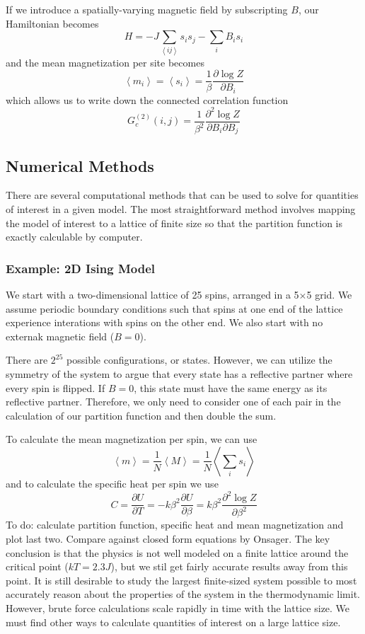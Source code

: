 \documentclass{article}
\begin{document}
If we introduce a spatially-varying magnetic field by subscripting $B$, our
Hamiltonian becomes
$$H = -J\sum_{\left \langle ij \right \rangle }s_{i}s_{j} - \sum_{i}B_{i}s_{i}$$
and the mean magnetization per site becomes
$$\left \langle m_{i} \right \rangle = \left \langle s_{i} \right \rangle = \frac{1}{\beta}\frac{\partial \log Z}{\partial B_{i}}$$
which allows us to write down the connected correlation function
$$G_{c}^{(2)}(i,j) = \frac{1}{\beta^{2}}\frac{\partial^{2} \log Z}{\partial B_{i}\partial B_{j}}$$

\subsection{Numerical Methods}
There are several computational methods that can be used to solve
for quantities of interest in a given model. The most straightforward method
involves mapping the model of interest to a lattice of finite size so that
the partition function is exactly calculable by computer.

\subsubsection{Example: 2D Ising Model}
We start with a two-dimensional lattice of 25 spins, arranged in a 5$\times$5 grid.
We assume periodic boundary conditions such that spins at one end of the lattice
experience interations with spins on the other end. We also start with no externak
magnetic field ($B = 0$).

There are $2^{25}$ possible configurations, or states. However, we can utilize
the symmetry of the system to argue that every state has a reflective partner
where every spin is flipped. If $B = 0$, this state must have the same energy
as its reflective partner. Therefore, we only need to consider one of each pair in
the calculation of our partition function and then double the sum.

To calculate the mean magnetization per spin, we can use
$$\left \langle m \right \rangle = \frac{1}{N} \left \langle M \right \rangle = \frac{1}{N}\left \langle \sum_{i}s_{i} \right \rangle $$
and to calculate the specific heat per spin we use
$$C = \frac{\partial U}{\partial T} = -k\beta^{2}\frac{\partial U}{\partial \beta} = k\beta^{2}\frac{\partial^{2} \log Z}{\partial \beta^{2}}$$
To do: calculate partition function, specific heat and mean magnetization and plot last two. Compare against closed form equations by Onsager.
The key conclusion is that the physics is not well modeled on a finite lattice around the critical point ($kT = 2.3J$), but we stil get fairly
accurate results away from this point. It is still desirable to study the largest finite-sized system possible
to most accurately reason about the properties of the system in the thermodynamic limit. However, brute force calculations
scale rapidly in time with the lattice size. We must find other ways to calculate quantities of interest on a large lattice size.
\end{document}
